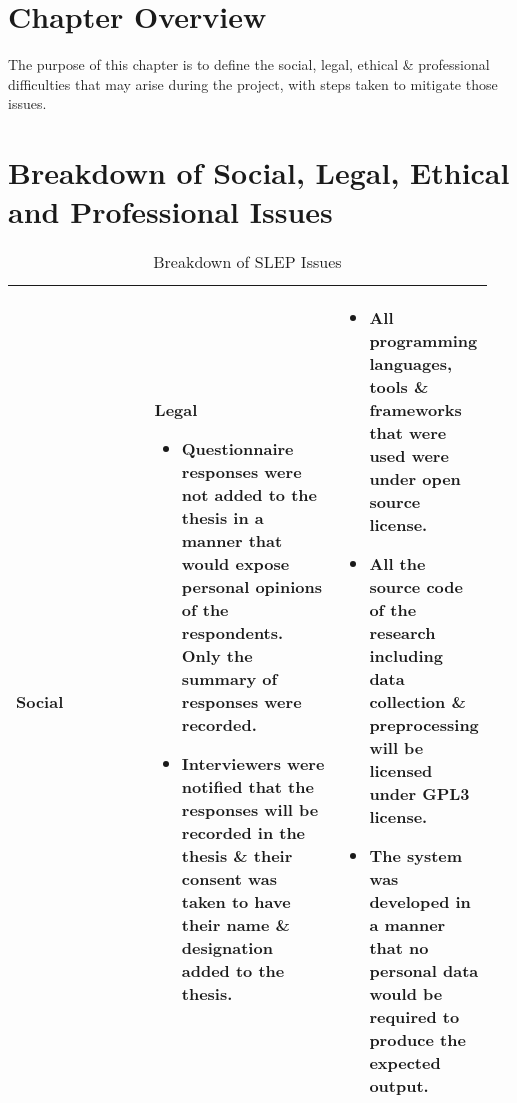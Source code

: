 \section{Chapter Overview}
The purpose of this chapter is to define the social, legal, ethical \& professional difficulties that may arise during the project, with steps taken to mitigate those issues.


\section{Breakdown of Social, Legal, Ethical and Professional Issues}

\vspace{-4mm}
\begin{longtable}{|p{0.473\linewidth}|p{0.473\linewidth}|}
\caption{Breakdown of SLEP Issues}\\ 
\hline
\textbf{Social} & \textbf{Legal} \endfirsthead 
\hline
\vspace{-7mm}       %
\begin{itemize}[leftmargin=*]
\item Questionnaire responses were not added to the thesis in a manner that would expose personal opinions of the respondents. Only the summary of responses were recorded.
\item Interviewers were notified that the responses will be recorded in the thesis \& their consent was taken to have their name \& designation added to the thesis.
\vspace{-7mm}       %
\end{itemize} & 
\vspace{-7mm}       %
\begin{itemize}[leftmargin=*]
\item All programming languages, tools \& frameworks that were used were under open source license.
\item All the source code of the research including data collection \& preprocessing will be licensed under GPL3 license.
\item The system was developed in a manner that no personal data would be required to produce the expected output.
\vspace{-7mm}       %
\end{itemize}
\\ 
\hline


\end{longtable}
